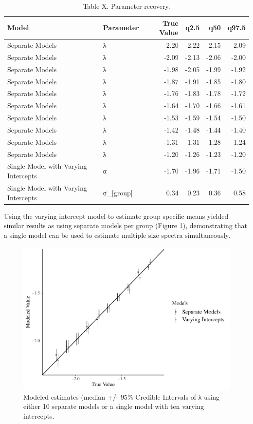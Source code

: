 \documentclass[
  12pt,
]{article}
\begin{document}
\begin{table}

\caption{\label{tab:unnamed-chunk-1}Table X. Parameter recovery.}
\centering
\begin{tabular}[t]{l|l|r|r|r|r}
\hline
Model & Parameter & True Value & q2.5 & q50 & q97.5\\
\hline
Separate Models & λ & -2.20 & -2.22 & -2.15 & -2.09\\
\hline
Separate Models & λ & -2.09 & -2.13 & -2.06 & -2.00\\
\hline
Separate Models & λ & -1.98 & -2.05 & -1.99 & -1.92\\
\hline
Separate Models & λ & -1.87 & -1.91 & -1.85 & -1.80\\
\hline
Separate Models & λ & -1.76 & -1.83 & -1.78 & -1.72\\
\hline
Separate Models & λ & -1.64 & -1.70 & -1.66 & -1.61\\
\hline
Separate Models & λ & -1.53 & -1.59 & -1.54 & -1.50\\
\hline
Separate Models & λ & -1.42 & -1.48 & -1.44 & -1.40\\
\hline
Separate Models & λ & -1.31 & -1.31 & -1.28 & -1.24\\
\hline
Separate Models & λ & -1.20 & -1.26 & -1.23 & -1.20\\
\hline
Single Model with Varying Intercepts & α & -1.70 & -1.96 & -1.71 & -1.50\\
\hline
Single Model with Varying Intercepts & σ\_[group] & 0.34 & 0.23 & 0.36 & 0.58\\
\hline
\end{tabular}
\end{table}

Using the varying intercept model to estimate group specific means
yielded similar results as using separate models per group (Figure 1),
demonstrating that a single model can be used to estimate multiple size
spectra simultaneously.

\begin{figure}
\centering
\includegraphics{stan_spectra_manuscript_update_files/figure-latex/unnamed-chunk-2-1.pdf}
\caption{Modeled estimates (median +/- 95\% Credible Intervals of λ
using either 10 separate models or a single model with ten varying
intercepts.}
\end{figure}
\end{document}
